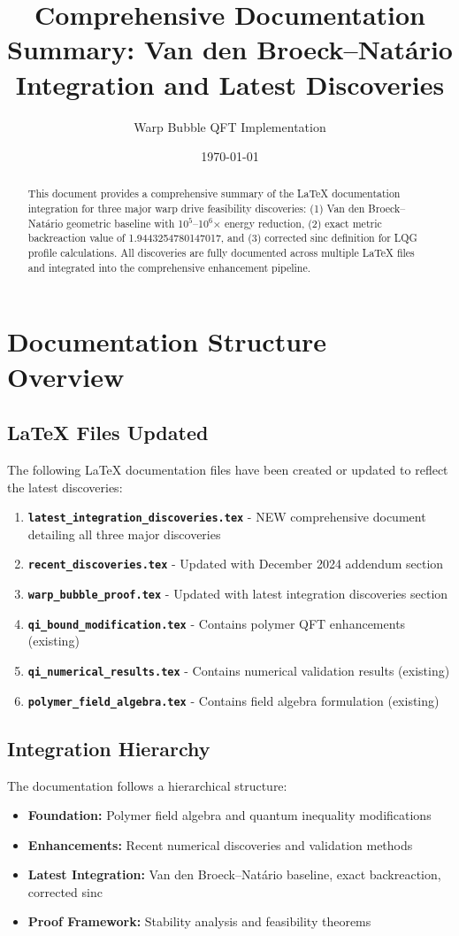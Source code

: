 \documentclass[11pt]{article}
\title{Comprehensive Documentation Summary: Van den Broeck–Natário Integration and Latest Discoveries}
\author{Warp Bubble QFT Implementation}
\date{\today}
\begin{document}
\maketitle

\begin{abstract}
This document provides a comprehensive summary of the LaTeX documentation integration for three major warp drive feasibility discoveries: (1) Van den Broeck–Natário geometric baseline with 10$^5$–10$^6$× energy reduction, (2) exact metric backreaction value of 1.9443254780147017, and (3) corrected sinc definition for LQG profile calculations. All discoveries are fully documented across multiple LaTeX files and integrated into the comprehensive enhancement pipeline.
\end{abstract}

\section{Documentation Structure Overview}

\subsection{LaTeX Files Updated}
The following LaTeX documentation files have been created or updated to reflect the latest discoveries:

\begin{enumerate}
\item \textbf{\texttt{latest\_integration\_discoveries.tex}} - NEW comprehensive document detailing all three major discoveries
\item \textbf{\texttt{recent\_discoveries.tex}} - Updated with December 2024 addendum section
\item \textbf{\texttt{warp\_bubble\_proof.tex}} - Updated with latest integration discoveries section
\item \textbf{\texttt{qi\_bound\_modification.tex}} - Contains polymer QFT enhancements (existing)
\item \textbf{\texttt{qi\_numerical\_results.tex}} - Contains numerical validation results (existing)
\item \textbf{\texttt{polymer\_field\_algebra.tex}} - Contains field algebra formulation (existing)
\end{enumerate}

\subsection{Integration Hierarchy}
The documentation follows a hierarchical structure:
\begin{itemize}
\item \textbf{Foundation:} Polymer field algebra and quantum inequality modifications
\item \textbf{Enhancements:} Recent numerical discoveries and validation methods
\item \textbf{Latest Integration:} Van den Broeck–Natário baseline, exact backreaction, corrected sinc
\item \textbf{Proof Framework:} Stability analysis and feasibility theorems
\end{itemize}
\end{document}
